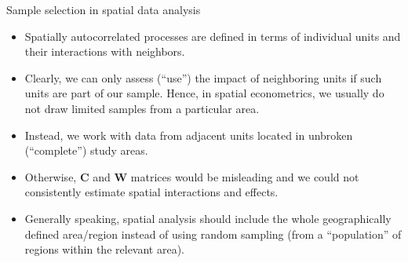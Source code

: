 \documentclass{beamer}
\begin{document}
\begin{frame}{Sample selection in spatial data analysis}
\begin{itemize}
    \item Spatially autocorrelated processes are defined in terms of individual units and their interactions with neighbors. 
    \smallskip
    \item Clearly, we can only assess (``use'') the impact of neighboring units if such units are part of our sample. Hence, in spatial econometrics, we usually do not draw limited samples from a particular area.
    \smallskip
    \item Instead, we work with data from adjacent units located in unbroken (``complete'') study areas.  
    \smallskip
    \item Otherwise, $\bm{C}$ and $\bm{W}$ matrices would be misleading and we could not consistently estimate spatial interactions and effects.
    \smallskip    
    \item Generally speaking, spatial analysis should include the whole geographically defined area/region instead of using random sampling (from a ``population'' of regions within the relevant area). 
\end{itemize}
\end{frame}
\end{document}
